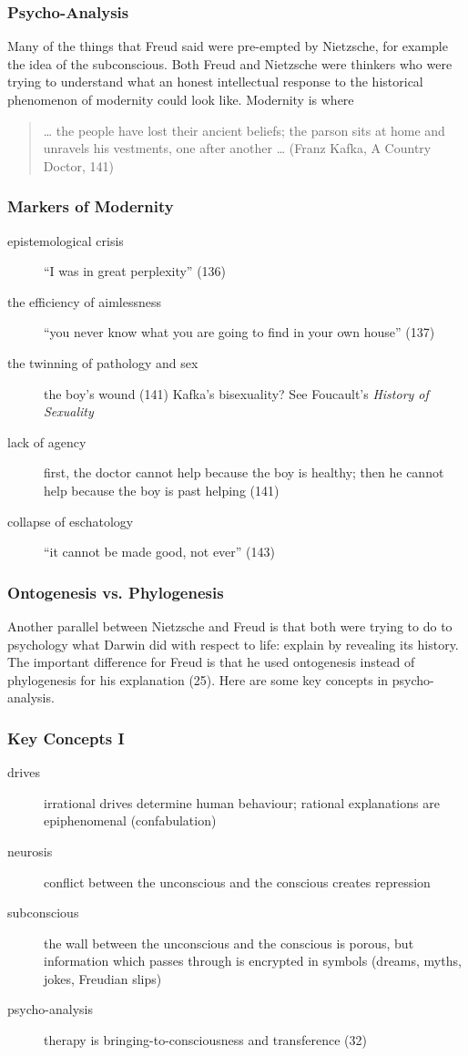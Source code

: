 \documentclass[xcolor=dvipsnames]{beamer}
\begin{document}
\begin{frame}
  \frametitle{Psycho-Analysis} 
  Many of the things that Freud said were pre-empted by Nietzsche, for
  example the idea of the subconscious. Both Freud and Nietzsche were
  thinkers who were trying to understand what an honest intellectual
  response to the historical phenomenon of modernity could look like.
  Modernity is where
\begin{quote}
  {\ldots} the people have lost their ancient beliefs; the parson sits
  at home and unravels his vestments, one after another {\ldots}
  (Franz Kafka, A Country Doctor, 141)
\end{quote}
\end{frame}

\begin{frame}
  \frametitle{Markers of Modernity} 
  \begin{description}
  \item[epistemological crisis] ``I was in great perplexity'' (136)
  \item[the efficiency of aimlessness] ``you never know what you are
    going to find in your own house'' (137)
  \item[the twinning of pathology and sex] the boy's wound (141)
    Kafka's bisexuality? See Foucault's \emph{History of Sexuality}
  \item[lack of agency] first, the doctor cannot help because the boy
    is healthy; then he cannot help because the boy is past helping (141)
  \item[collapse of eschatology] ``it cannot be made good, not ever''
    (143)
  \end{description}
\end{frame}

\begin{frame}
  \frametitle{Ontogenesis vs. Phylogenesis} Another parallel between
  Nietzsche and Freud is that both were trying to do to psychology
  what Darwin did with respect to life: explain by revealing its
  history. The important difference for Freud is that he used
  \alert{ontogenesis} instead of \alert{phylogenesis} for his
  explanation (25). Here are some key concepts in psycho-analysis.
\end{frame}

\begin{frame}
  \frametitle{Key Concepts I} 
  \begin{description}
  \item[drives] irrational drives determine human behaviour; rational
    explanations are epiphenomenal (confabulation)
  \item[neurosis] conflict between the unconscious and the conscious
    creates repression
  \item[subconscious] the wall between the unconscious and the
    conscious is porous, but information which passes through is
    encrypted in symbols (dreams, myths, jokes, Freudian slips)
  \item[psycho-analysis] therapy is bringing-to-consciousness and
    transference (32)
  \end{description}
\end{frame}
\end{document}
